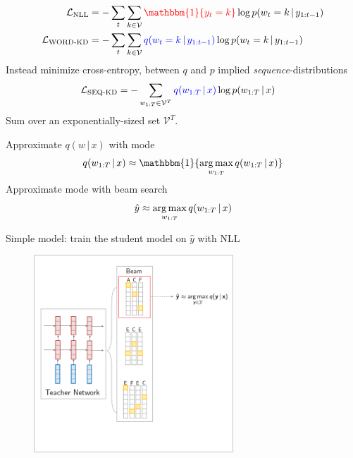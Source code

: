 \documentclass{beamer}
\newcommand{\air}{\vspace{0.25cm}}
\newcommand{\given}{\,|\,}
\def\argmax{\operatornamewithlimits{arg\,max}}
\def\argmax{\operatornamewithlimits{arg\,max}}
\begin{document}
\begin{frame}
\centerline{}
\air 
\begin{align*}
\mathcal{L}_{\text{NLL}} &=- \sum_t \sum_{k \in \mathcal{V}} {\color{red}{\mathbbm{1}\{y_t = k\}}} \log p(w_t = k \given  y_{1:t-1}) \\
\mathcal{L}_{\text{WORD-KD}} &=- \sum_t \sum_{k \in \mathcal{V}} {\color{blue}{q(w_t = k \given y_{1:t-1})}} \log p(w_t = k \given  y_{1:t-1})
\end{align*}
\pause
Instead minimize cross-entropy, between $q$ and $p$ implied \emph{sequence}-distributions 
\begin{align*}
\mathcal{L}_\text{SEQ-KD} &=  -\sum_{w_{1:T} \in \mathcal{V}^T}{\color{blue}{q(w_{1:T} \given x)}}  \log p(w_{1:T} \given x  )
\end{align*}
\air
Sum over an exponentially-sized set $\mathcal{V}^T$. 
\end{frame}

\begin{frame}
\centerline{}
\air 
\air
Approximate $q(w \given x )$ with mode
$$q(w_{1:T} \given x) \approx \mathbbm{1}\{\argmax_{w_{1:T}} q(w_{1:T} \given x )\}$$
\air
\pause
Approximate mode with  beam search 
$$ \hat{y} \approx  \argmax_{w_{1:T}} q(w_{1:T} \given x) $$
\pause

Simple model: train the student model on $\hat{y}$ with NLL
\end{frame}


\begin{frame}
\centerline{}
\air 
\air
\begin{figure}
\center
\includegraphics[width=7.5cm]{seq-kd-1}
\end{figure}
\end{frame}
\end{document}
